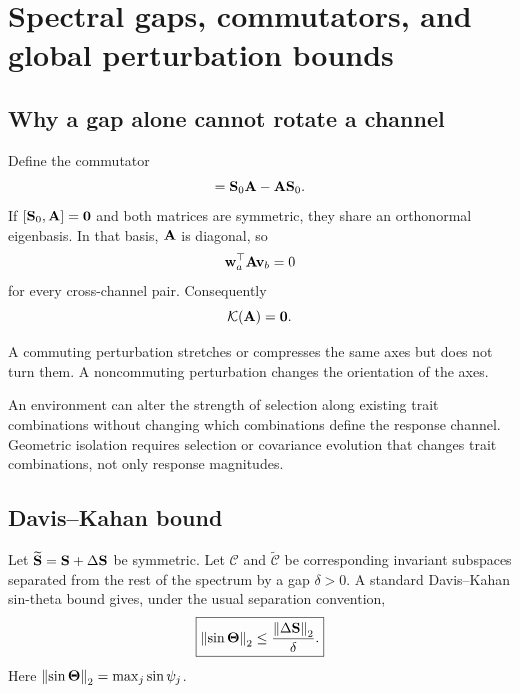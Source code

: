 \chapter{Spectral gaps, commutators, and global perturbation bounds}

\section{Why a gap alone cannot rotate a channel}

Define the commutator
\begin{equation}
[\Sop_0,\Aa]=\Sop_0\Aa-\Aa\Sop_0.
\end{equation}
If \([\mathbf{S}_0,\mathbf{A}]=\mathbf{0}\) and both matrices are symmetric, they share an orthonormal eigenbasis. In that basis, \(\mathbf{A}\) is diagonal, so
\begin{equation}
\mathbf w_a^\top\mathbf{A}\mathbf v_b=0
\end{equation}
for every cross-channel pair. Consequently
\begin{equation}
\mathcal K(\mathbf{A})=\mathbf{0}.
\end{equation}

\begin{geombox}
A commuting perturbation stretches or compresses the same axes but does not turn them. A noncommuting perturbation changes the orientation of the axes.
\end{geombox}

\begin{biobox}
An environment can alter the strength of selection along existing trait combinations without changing which combinations define the response channel. Geometric isolation requires selection or covariance evolution that changes trait combinations, not only response magnitudes.
\end{biobox}

\section{Davis--Kahan bound}

Let \(\widetilde{\mathbf{S}}=\mathbf{S}+\Delta\mathbf{S}\) be symmetric. Let \(\mathcal C\) and \(\widetilde{\mathcal C}\) be corresponding invariant subspaces separated from the rest of the spectrum by a gap \(\delta>0\). A standard Davis--Kahan sin-theta bound gives, under the usual separation convention,
\begin{equation}
\boxed{
\left\lVert \sin\boldsymbol\Theta\right\rVert_2
\le\frac{\left\lVert \Delta\mathbf{S}\right\rVert_2}{\delta}.}
\label{eq:DavisKahan}
\end{equation}
Here \(\left\lVert \sin\boldsymbol\Theta\right\rVert_2=\max_j\sin\psi_j\).

